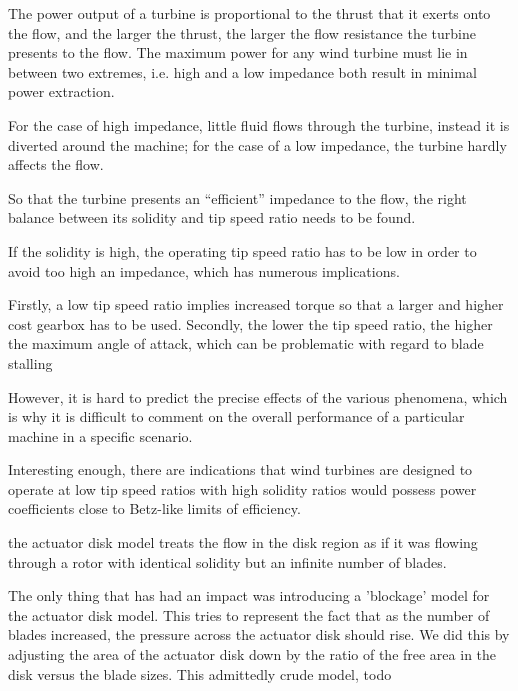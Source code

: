 The power output of a turbine is proportional to the thrust that it
exerts onto the flow, and the larger the thrust, the larger the flow
resistance the turbine presents to the flow. The maximum power for any
wind turbine must lie in between two extremes, i.e. high and
a low impedance both result in minimal power
extraction\cite{solidity_oxford}.  

For the case of high impedance, little fluid flows through the
turbine, instead it is diverted around the machine; for the case of a
low impedance, the turbine hardly affects the flow. 

So that the turbine presents an ``efficient'' impedance to the flow, the 
right balance between its solidity and tip speed ratio needs to be found.

If the solidity is high, the operating tip speed ratio has to be low in
order to avoid too high an impedance, which has numerous implications. 

Firstly, a low tip speed ratio implies increased torque so that a larger
and higher cost gearbox has to be used. Secondly, the lower the tip
speed ratio, the higher the maximum angle of attack, which can be
problematic with regard to blade stalling

However, it is hard to predict the precise effects of the various
phenomena, which is why it is difficult to comment on the overall
performance of a particular machine in a specific
scenario. 

Interesting enough, there are indications that wind turbines are
designed to operate at low tip speed ratios with high solidity ratios
would possess power coefficients close to Betz-like limits of
efficiency\cite{WE:WE118}. 


the actuator disk model treats the flow in the disk region as if it was
flowing through a rotor with identical solidity but an infinite number
of blades. 

The only thing that has had an impact was introducing a 'blockage' model
for the actuator disk model. This tries to represent the fact that as
the number of blades increased, the pressure across the actuator disk
should rise. We did this by adjusting the area of the actuator disk down
by the ratio of the free area in the disk versus the blade sizes. 
This admittedly crude model, todo

